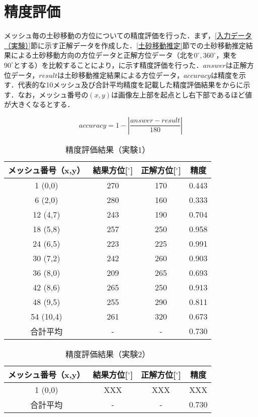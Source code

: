   \section{精度評価}
    メッシュ毎の土砂移動の方位についての精度評価を行った．まず，\ref{入力データ（実験）}節に示す正解データを作成した．\ref{土砂移動推定}節での土砂移動推定結果による土砂移動方向の方位データと正解方位データ（北を$0^{\circ},360^{\circ}$，東を$90^{\circ}とする$）を比較することにより，に示す精度評価を行った．$answer$は正解方位データ，$result$は土砂移動推定結果による方位データ，$accuracy$は精度を示す．代表的な10メッシュ及び合計平均精度を記載した精度評価結果をからに示す．なお，メッシュ番号の$(x,y)$は画像左上部を起点とし右下部であるほど値が大きくなるとする．

    \begin{equation}
      \label{精度評価}
      accuracy = 1 - |\dfrac{answer - result} {180}|
    \end{equation}

    \begin{table}[tbp]
      \centering
      \caption{精度評価結果（実験1）}
      \label{精度評価結果（実験1）}
      \begin{tabular}{cccc}
        \hline
        \textbf{メッシュ番号（x,y）} & \textbf{結果方位[$^{\circ}$]} & \textbf{正解方位[$^{\circ}$]} & \textbf{精度} \\
        \hline  \hline
        1  (0,0)  & 270 & 170 & 0.443 \\
        6  (2,0)  & 280 & 160 & 0.333 \\
        12 (4,7)  & 243 & 190 & 0.704 \\
        18 (5,8)  & 257 & 250 & 0.958 \\
        24 (6,5)  & 223 & 225 & 0.991 \\
        30 (7,2)  & 242 & 260 & 0.903 \\
        36 (8,0)  & 209 & 265 & 0.693 \\
        42 (8,6)  & 265 & 250 & 0.913 \\
        48 (9,5)  & 255 & 290 & 0.811 \\
        54 (10,4) & 261 & 320 & 0.673 \\
        合計平均 & - & - & 0.730 \\
        \hline
      \end{tabular}
    \end{table}

    \begin{table}[tbp]
      \centering
      \caption{精度評価結果（実験2）}
      \begin{tabular}{cccc}
        \hline
        \textbf{メッシュ番号（x,y）} & \textbf{結果方位[$^{\circ}$]} & \textbf{正解方位[$^{\circ}$]} & \textbf{精度} \\
        \hline  \hline
        1  (0,0)  & XXX & XXX & XXX \\
        合計平均 & - & - & 0.730 \\
        \hline
      \end{tabular}
    \end{table}

